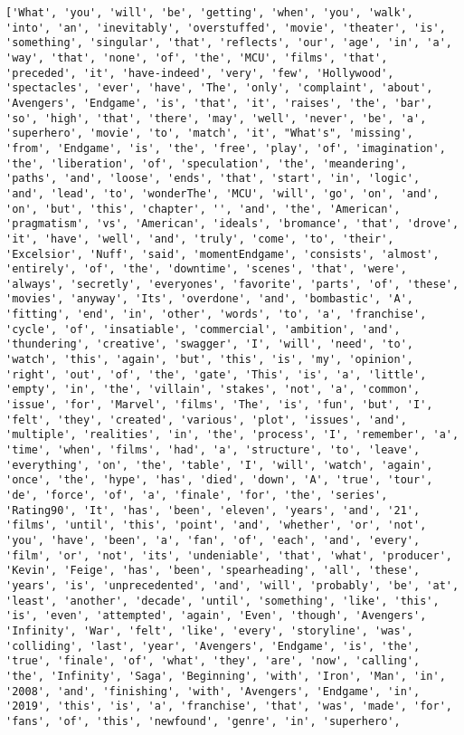 \documentclass[11pt]{article}
\begin{document}
    \begin{Verbatim}[commandchars=\\\{\}]
['What', 'you', 'will', 'be', 'getting', 'when', 'you', 'walk', 'into', 'an', 'inevitably', 'overstuffed', 'movie', 'theater', 'is', 'something', 'singular', 'that', 'reflects', 'our', 'age', 'in', 'a', 'way', 'that', 'none', 'of', 'the', 'MCU', 'films', 'that', 'preceded', 'it', 'have-indeed', 'very', 'few', 'Hollywood', 'spectacles', 'ever', 'have', 'The', 'only', 'complaint', 'about', 'Avengers', 'Endgame', 'is', 'that', 'it', 'raises', 'the', 'bar', 'so', 'high', 'that', 'there', 'may', 'well', 'never', 'be', 'a', 'superhero', 'movie', 'to', 'match', 'it', "What's", 'missing', 'from', 'Endgame', 'is', 'the', 'free', 'play', 'of', 'imagination', 'the', 'liberation', 'of', 'speculation', 'the', 'meandering', 'paths', 'and', 'loose', 'ends', 'that', 'start', 'in', 'logic', 'and', 'lead', 'to', 'wonderThe', 'MCU', 'will', 'go', 'on', 'and', 'on', 'but', 'this', 'chapter', '', 'and', 'the', 'American', 'pragmatism', 'vs', 'American', 'ideals', 'bromance', 'that', 'drove', 'it', 'have', 'well', 'and', 'truly', 'come', 'to', 'their', 'Excelsior', 'Nuff', 'said', 'momentEndgame', 'consists', 'almost', 'entirely', 'of', 'the', 'downtime', 'scenes', 'that', 'were', 'always', 'secretly', 'everyones', 'favorite', 'parts', 'of', 'these', 'movies', 'anyway', 'Its', 'overdone', 'and', 'bombastic', 'A', 'fitting', 'end', 'in', 'other', 'words', 'to', 'a', 'franchise', 'cycle', 'of', 'insatiable', 'commercial', 'ambition', 'and', 'thundering', 'creative', 'swagger', 'I', 'will', 'need', 'to', 'watch', 'this', 'again', 'but', 'this', 'is', 'my', 'opinion', 'right', 'out', 'of', 'the', 'gate', 'This', 'is', 'a', 'little', 'empty', 'in', 'the', 'villain', 'stakes', 'not', 'a', 'common', 'issue', 'for', 'Marvel', 'films', 'The', 'is', 'fun', 'but', 'I', 'felt', 'they', 'created', 'various', 'plot', 'issues', 'and', 'multiple', 'realities', 'in', 'the', 'process', 'I', 'remember', 'a', 'time', 'when', 'films', 'had', 'a', 'structure', 'to', 'leave', 'everything', 'on', 'the', 'table', 'I', 'will', 'watch', 'again', 'once', 'the', 'hype', 'has', 'died', 'down', 'A', 'true', 'tour', 'de', 'force', 'of', 'a', 'finale', 'for', 'the', 'series', 'Rating90', 'It', 'has', 'been', 'eleven', 'years', 'and', '21', 'films', 'until', 'this', 'point', 'and', 'whether', 'or', 'not', 'you', 'have', 'been', 'a', 'fan', 'of', 'each', 'and', 'every', 'film', 'or', 'not', 'its', 'undeniable', 'that', 'what', 'producer', 'Kevin', 'Feige', 'has', 'been', 'spearheading', 'all', 'these', 'years', 'is', 'unprecedented', 'and', 'will', 'probably', 'be', 'at', 'least', 'another', 'decade', 'until', 'something', 'like', 'this', 'is', 'even', 'attempted', 'again', 'Even', 'though', 'Avengers', 'Infinity', 'War', 'felt', 'like', 'every', 'storyline', 'was', 'colliding', 'last', 'year', 'Avengers', 'Endgame', 'is', 'the', 'true', 'finale', 'of', 'what', 'they', 'are', 'now', 'calling', 'the', 'Infinity', 'Saga', 'Beginning', 'with', 'Iron', 'Man', 'in', '2008', 'and', 'finishing', 'with', 'Avengers', 'Endgame', 'in', '2019', 'this', 'is', 'a', 'franchise', 'that', 'was', 'made', 'for', 'fans', 'of', 'this', 'newfound', 'genre', 'in', 'superhero', 
\end{Verbatim}
\end{document}
